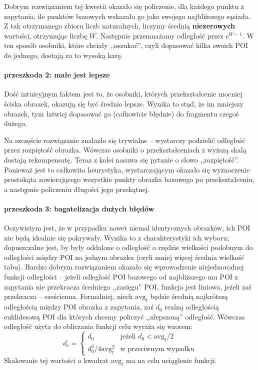 \documentclass[a4paper,12pt,leqno]{article}
\begin{document}
Dobrym rozwiązaniem tej kwestii okazało się policzenie, dla każdego punktu z zapytania, ile punktów bazowych wskazało go jako swojego najbliższego sąsiada. 
Z tak otrzymanego zbioru liczb naturalnych, liczymy średnią \textbf{niezerowych} wartości, otrzymując liczbę $W$.
Następnie przemnażamy odległość przez $e^{W-1}$. W ten sposób osobniki, które chciały ,,oszukać'', czyli dopasować kilka swoich POI do jednego, dostają za to wysoką karę.


\paragraph{przeszkoda 2: małe jest lepsze}
Dość intuicyjnym faktem jest to, że osobniki, których przekształcenie mocniej ściska obrazek, okazują się być średnio lepsze. Wynika to stąd, że im mniejszy obrazek, 
tym łatwiej dopasować go (całkowicie błędnie) do fragmentu czegoś dużego. 

Na szczęście rozwiązanie znalazło się trywialne -- wystarczy podzielić odległość przez rozpiętość obrazka. Wówczas osobniki o przekształceniach z wyższą skalą dostają rekompensatę.
Teraz z kolei nasuwa się pytanie o słowo ,,rozpiętość''. Ponieważ jest to całkowita heurystyka, wystarczającym okazało się wyznaczenie prostokąta zawierającego wszystkie punkty 
obrazka bazowego po przekształceniu, a następnie policzeniu długości jego przekątnej.

\paragraph{przeszkoda 3: bagatelizacja dużych błędów}
Oczywistym jest, że w przypadku nawet niemal identycznych obrazków, ich POI nie będą idealnie się pokrywały. Wynika to z charakterystyki ich wyboru; dopuszczalne jest, by były oddalone
o odległość o rzędzie wielkości podobnym do odległości między POI na jednym obrazku (czyli mniej więcej średnia wielkość tabu). 
Bardzo dobrym rozwiązaniem okazało się wprowadzenie niejednorodnej funkcji odległości -- jeżeli odległość POI bazowego od najbliższego mu POI z zapytania nie przekracza średniego ,,zasięgu''
POI, funkcja jest liniowa, jeżeli zaś przekracza -- sześcienna.
Formalniej, niech $\mathrm{avg}_t$ będzie średnią najkrótszą odległością między POI obrazka z zapytania, zaś $d_0$ realną odległością euklidesową POI dla których chcemy policzyć ,,ulepszoną'' odległość.
Wówczas odległość użyta do obliczania funkcji celu wyraża się wzorem:
\[ d_r = \begin{cases}
	    d_0 & \text{jeżeli } d_0 < \mathrm{avg}_t / 2 \\
	    d_0^3 / 4\mathrm{avg}_t^2 & \text{w przeciwnym wypadku}
	 \end{cases} \]
Skalowanie tej wartości o kwadrat $\mathrm{avg}_t$ ma na celu uciąglenie funkcji.
\end{document}
